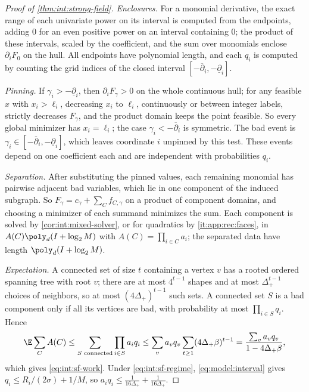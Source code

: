 \begin{proof}[Proof of \cref{thm:int:strong-field}]
\emph{Enclosures.} For a monomial derivative, the exact range of each univariate power
on its interval is computed from the endpoints, adding $0$ for an even positive power
on an interval containing $0$; the product of these intervals, scaled by the
coefficient, and the sum over monomials enclose $\partial_iF_0$ on the hull. All
endpoints have polynomial length, and each $q_i$ is computed by counting the grid
indices of the closed interval $[-\overline\partial_i,-\underline\partial_i]$.

\emph{Pinning.} If $\gamma_i>-\underline\partial_i$, then $\partial_iF_\gamma>0$ on the
whole continuous hull; for any feasible $x$ with $x_i>\ell_i$, decreasing $x_i$ to
$\ell_i$, continuously or between integer labels, strictly decreases $F_\gamma$, and the
product domain keeps the point feasible. So every global minimizer has $x_i=\ell_i$; the
case $\gamma_i<-\overline\partial_i$ is symmetric. The bad event is
$\gamma_i\in[-\overline\partial_i,-\underline\partial_i]$, which leaves
coordinate $i$ unpinned by this test. These events depend on one coefficient
each and are independent with probabilities $q_i$.

\emph{Separation.} After substituting the pinned values, each remaining monomial has
pairwise adjacent bad variables, which lie in one component of the induced subgraph.
So $F_\gamma=c_\gamma+\sum_Cf_{C,\gamma}$ on a product of component domains, and choosing
a minimizer of each summand minimizes the sum. Each component is solved by
\cref{cor:int:mixed-solver}, or for quadratics by \ref{it:app:rec:faces}, in
$A(C)\poly_d(I+\log_2M)$ with $A(C)=\prod_{i\in C}a_i$; the separated data have length
$\poly_d(I+\log_2M)$.

\emph{Expectation.} A connected set of size $t$ containing a vertex $v$ has a rooted
ordered spanning tree with root $v$; there are at most $4^{t-1}$ shapes and at most
$\Delta_+^{t-1}$ choices of neighbors, so at most $(4\Delta_+)^{t-1}$ such sets. A
connected set $S$ is a bad component only if all its vertices are bad, with probability
at most $\prod_{i\in S}q_i$. Hence
\[
 \E\sum_{C}A(C)\le\sum_{S\text{ connected}}\prod_{i\in S}a_iq_i
 \le\sum_va_vq_v\sum_{t\ge1}(4\Delta_+\beta)^{t-1}=\frac{\sum_va_vq_v}{1-4\Delta_+\beta},
\]
which gives \eqref{eq:int:sf-work}. Under \eqref{eq:int:sf-regime},
\eqref{eq:model:interval} gives $q_i\le R_i/(2\sigma)+1/M$, so
$a_iq_i\le\frac1{16\Delta_+}+\frac1{16\Delta_+}$.


\end{proof}
